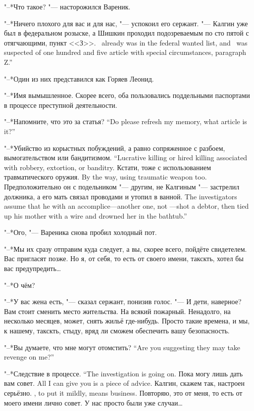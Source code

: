 "--*Что такое? "--- насторожился Вареник.

"--*Ничего плохого для вас и для нас, "--- успокоил его сержант.
{"--- Калгин уже был в федеральном розыске, а Шишкин проходил подозреваемым по сто пятой с отягчающими, пункт <<З>>.}
{\Kalgin\ already was in the federal wanted list, and \Shishkin\ was suspected of one hundred and five article with special circumstances, paragraph Z.''}

"--*Один из них представился как Горяев Леонид.

"--*Имя вымышленное.
Скорее всего, оба пользовались поддельными паспортами в процессе преступной деятельности.

{"--*Напомните, что это за статья?}
{``Do please refresh my memory, what article is it?''}

{"--*Убийство из корыстных побуждений, а равно сопряженное с разбоем, вымогательством или бандитизмом.}
{``Lucrative killing or hired killing associated with robbery, extortion, or banditry.}
{Кстати, тоже с использованием травматического оружия.}
{By the way, using traumatic weapon too.}
{Предположительно он с подельником "--- другим, не Калгиным "--- застрелил должника, а его мать связал проводами и утопил в ванной.}
{The investigators assume that he with an accomplice---another one, not \Kalgin---shot a debtor, then tied up his mother with a wire and drowned her in the bathtub.''}

"--*Ого, "--- Вареника снова пробил холодный пот.

"--*Мы их сразу отправим куда следует, а вы, скорее всего, пойдёте свидетелем.
Вас пригласят позже.
Но я, от себя, то есть от своего имени, такскть, хотел бы вас предупредить\ldots{}

"--*О чём?

"--*У вас жена есть, "--- сказал сержант, понизив голос.
"--- И дети, наверное?
Вам стоит сменить место жительства.
На всякий пожарный.
Ненадолго, на несколько месяцев, может, снять жильё где-нибудь.
Просто такие времена, и мы, к нашему, такскть, стыду, вряд ли сможем обеспечить вашу безопасность.

{"--*Вы думаете, что мне могут отомстить?}
{``Are you suggesting they may take revenge on me?''}

{"--*Следствие в процессе.}
{``The investigation is going on.}
{Пока могу лишь дать вам совет.}
{All I can give you is a piece of advice.}
{Калгин, скажем так, настроен серьёзно.}
{\Kalgin, to put it mildly, means business.}
Повторяю, это от меня, то есть от моего имени лично совет.
У нас просто были уже случаи\ldots{}


